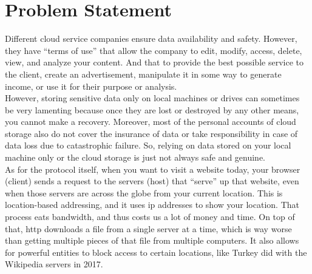 \section{Problem Statement}

Different cloud service companies ensure data availability and safety. However, they have ``terms of use'' that allow the company to edit, modify, access, delete, view, and analyze your content. And that to provide the best possible service to the client, create an advertisement, manipulate it in some way to generate income, or use it for their purpose or analysis. \\[-8pt]

However, storing sensitive data only on local machines or drives can sometimes be very lamenting because once they are lost or destroyed by any other means, you cannot make a recovery. Moreover, most of the personal accounts of cloud storage also do not cover the insurance of data or take responsibility in case of data loss due to catastrophic failure. So, relying on data stored on your local machine only or the cloud storage is just not always safe and genuine. \\[-8pt]

As for the protocol itself, when you want to visit a website today, your browser (client) sends a request to the servers (host) that ``serve'' up that website, even when those servers are across the globe from your current location. This is location-based addressing, and it uses \gls{ip} addresses to show your location. That process eats \gls{bandwidth}, and thus costs us a lot of money and time. On top of that, \gls{http} downloads a file from a single server at a time, which is way worse than getting multiple pieces of that file from multiple computers. It also allows for powerful entities to block access to certain locations, like Turkey did with the Wikipedia servers in 2017. \\[-8pt]


